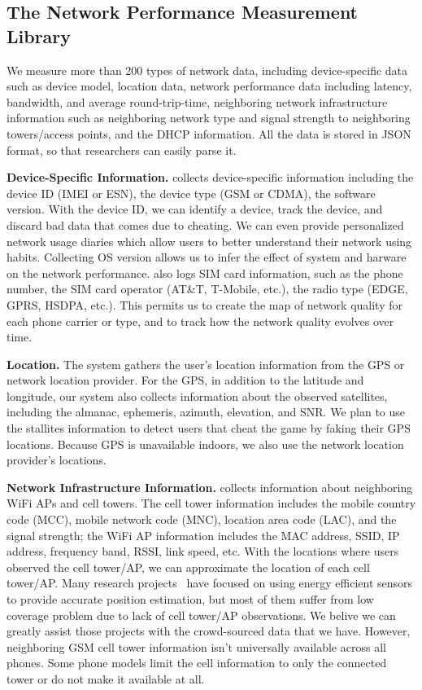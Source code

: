 \subsection{The Network Performance Measurement Library}
\label{ss:measurements}
We measure more than 200 types of network data, including device-specific data such as device model, 
location data, network performance data including latency, bandwidth, and average round-trip-time, 
neighboring network infrastructure information such as neighboring network type and signal strength to 
neighboring towers/access points, and the DHCP information. All the data is stored in JSON format, so
that researchers can easily parse it.


{\bfseries Device-Specific Information.} \name{} collects device-specific information including the device ID 
(IMEI or ESN), the device type (GSM or CDMA), the software version. With the device ID, we can 
identify a device, track the device, and discard bad data that comes due to cheating. We can 
even provide personalized network usage diaries which allow users to better understand their network 
using habits.
Collecting OS version allows us to infer the effect of system and harware on the network performance. \name{} also 
logs SIM card information, such as the phone number, the SIM card operator (AT\&T, T-Mobile, etc.),
the radio type (EDGE, GPRS, HSDPA, etc.).
This permits us to create the map of network quality for each phone carrier or type, and to track how the network quality 
evolves over time.

{\bfseries Location.} The system gathers the user's location information from the GPS or network location provider. 
For the GPS, in addition to the latitude and longitude, our system also collects information 
about the observed satellites, including the almanac, ephemeris, azimuth, elevation, and SNR.
We plan to use the stallites information to detect users that cheat the game by faking their GPS locations.
Because GPS is unavailable indoors, we also use the network location provider's locations.


{\bfseries Network Infrastructure Information.} \name{} collects information about
neighboring WiFi APs and cell towers. The cell tower information includes the mobile country code (MCC), 
mobile network code (MNC), location area code (LAC), and the signal strength; the WiFi AP information
includes the MAC address, SSID, IP address, frequency band, RSSI, link speed, etc.
With the locations where users observed the cell tower/AP, we can approximate the location of 
each cell tower/AP. Many research projects~\cite{ctrack, vtrack-sensys09} have focused on using 
energy efficient sensors to provide accurate position estimation, but most of them suffer from
low coverage problem due to lack of cell tower/AP observations. We belive we can greatly assist those projects
with the crowd-sourced data that we have. However, neighboring GSM cell tower information isn't 
universally available across all phones. Some phone models limit the cell information to only 
the connected tower or do not make it available at all.

